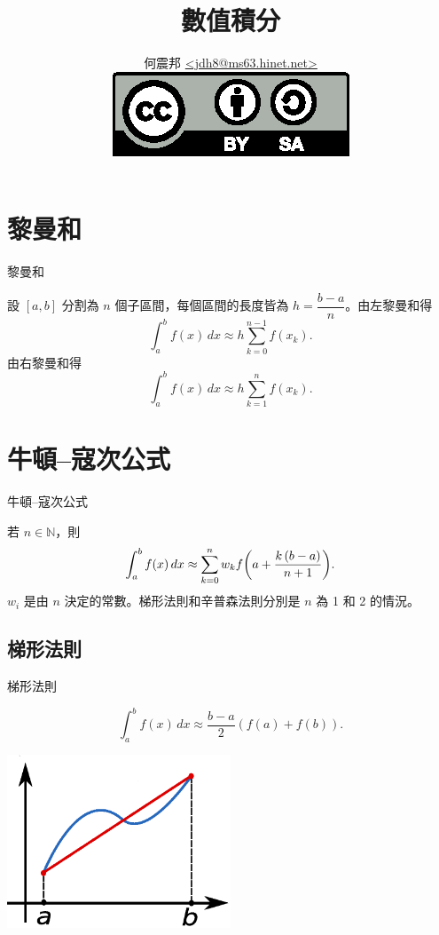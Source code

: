 \documentclass{beamer}
\title{數值積分}
\author[何震邦]{何震邦 \href{mailto:jdh8@ms63.hinet.net}{\textless jdh8@ms63.hinet.net\textgreater}\\
    \href{http://creativecommons.org/licenses/by-sa/3.0/tw/deed.zh\textunderscore TW}{\includegraphics{by-sa.eps}}}
\newcommand{\Left} {\mathopen{}\mathclose\bgroup\left}
\newcommand{\Right}{\aftergroup\egroup\right}
\newcommand{\NN}{\mathbb N}
\theoremstyle{remark}
\begin{document}
\begin{CJK}{UTF8}{bsmi}
\maketitle

\section{黎曼和}
\begin{frame}{黎曼和}
  \begin{theorem}
    設 $[a,b]$ 分割為 $n$ 個子區間，每個區間的長度皆為 $h = \dfrac{b-a}{n}$。由左黎曼和得
    \[\int_a^b f(x)\,dx \approx h \sum_{k=0}^{n-1} f(x_k).\]
    由右黎曼和得
    \[\int_a^b f(x)\,dx \approx h \sum_{k=1}^{n} f(x_k).\]
  \end{theorem}
\end{frame}

\section{牛頓--寇次公式}
\begin{frame}{牛頓--寇次公式}
  \begin{theorem}
    若 $n \in \NN$，則
    \[\int_a^b f(x)\,dx \approx \sum_{k=0}^n w_k f \Left( a + \frac{k \left( b-a \right)}{n+1} \Right).\]
    $w_i$ 是由 $n$ 決定的常數。梯形法則和辛普森法則分別是 $n$ 為 1 和 2 的情況。
  \end{theorem}
\end{frame}

\subsection{梯形法則}
\begin{frame}{梯形法則}
  \begin{theorem}
    \[\int_a^b f(x)\,dx \approx \frac{b-a}{2} \left( f(a) + f(b) \right).\]
  \end{theorem}
  \begin{center}
    \includegraphics[width=0.5\textwidth]{Trapezoidal_rule_illustration}
  \end{center}
\end{frame}


\end{CJK}
\end{document}
